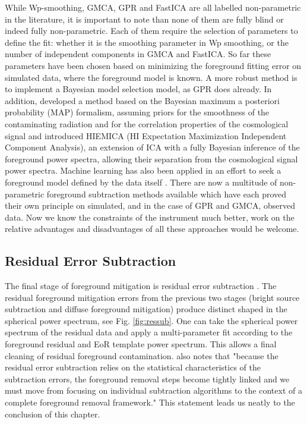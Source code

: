 While Wp-smoothing, GMCA, GPR and FastICA are all labelled non-parametric in the literature, it is important to note than none of them are fully blind or indeed fully non-parametric. Each of them require the selection of parameters to define the fit: whether it is the smoothing parameter in Wp smoothing, or the number of independent components in GMCA and FastICA. So far these parameters have been chosen based on minimizing the foreground fitting error on simulated data, where the foreground model is known. A more robust method is to implement a Bayesian model selection model, as GPR does already. In addition, \citet{Gleser2008MNRAS.391..383G} developed a method based on the Bayesian maximum a posteriori probability (MAP) formalism, assuming priors for the smoothness of the contaminating radiation and for the correlation properties of the cosmological signal and \citet{Zhang2016ApJS..222....3Z} introduced HIEMICA (HI Expectation Maximization Independent Component Analysis), an extension of ICA with a fully Bayesian inference of the foreground power spectra, allowing their separation from the cosmological signal power spectra. Machine learning has also been applied in an effort to seek a foreground model defined by the data itself \citet{Li2019MNRAS.485.2628L}. There are now a multitude of non-parametric foreground subtraction methods available which have each proved their own principle on simulated, and in the case of GPR and GMCA, observed data. Now we know the constraints of the instrument much better, work on the relative advantages and disadvantages of all these approaches would be welcome.

\subsection{Residual Error Subtraction}
The final stage of foreground mitigation is residual error subtraction \citet{Morales2006ApJ...648..767M,Morales2004ApJ...615....7M}. The residual foreground mitigation errors from the previous two stages (bright source subtraction and diffuse foreground mitigation) produce distinct shaped in the spherical power spectrum, see Fig. \ref{fig:ressub}. One can take the spherical power spectrum of the residual data and apply a multi-parameter fit according to the foreground residual and EoR template power spectrum. This allows a final cleaning of residual foreground contamination. \citet{Morales2006ApJ...648..767M} also notes that "because the residual error subtraction relies on the statistical characteristics of the subtraction errors, the foreground removal steps become tightly linked and we must move from focusing on individual subtraction algorithms to the context of a complete foreground removal framework." This statement leads us neatly to the conclusion of this chapter.

